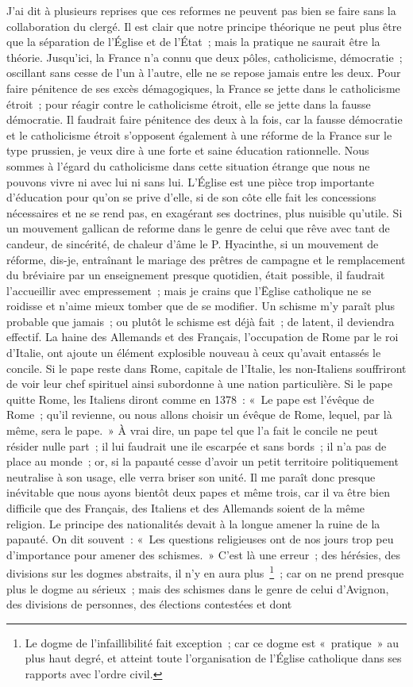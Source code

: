 \documentclass[french,twoside]{book} %
\begin{document}
J’ai dit à plusieurs reprises que ces reformes ne peuvent pas bien se faire sans la collaboration du clergé. Il est clair que notre principe théorique ne peut plus être que la séparation de l’Église et de l’État ; mais la pratique ne saurait être la théorie. Jusqu’ici, la France n’a connu que deux pôles, catholicisme, démocratie ; oscillant sans cesse de l’un à l’autre, elle ne se repose jamais entre les deux. Pour faire pénitence de ses excès démagogiques, la France se jette dans le catholicisme étroit ; pour réagir contre le catholicisme étroit, elle se jette dans la fausse démocratie. Il faudrait faire pénitence des deux à la fois, car la fausse démocratie et le catholicisme étroit s’opposent également à une réforme de la France sur le type prussien, je veux dire à une forte et saine éducation rationnelle. Nous sommes à l’égard du catholicisme dans cette situation étrange que nous ne pouvons vivre ni avec lui ni sans lui. L’Église est une pièce trop importante d’éducation pour qu’on se prive d’elle, si de son côte elle fait les concessions nécessaires et ne se rend pas, en exagérant ses doctrines, plus nuisible qu’utile. Si un mouvement gallican de reforme dans le genre de celui que rêve avec tant de candeur, de sincérité, de chaleur d’âme le P. Hyacinthe, si un mouvement de réforme, dis-je, entraînant le mariage des prêtres de campagne et le remplacement du bréviaire par un enseignement presque quotidien, était possible, il faudrait l’accueillir avec empressement ; mais je crains que l’Ëglise catholique ne se roidisse et n’aime mieux tomber que de se modifier. Un schisme m’y paraît plus probable que jamais ; ou plutôt le schisme est déjà fait ; de latent, il deviendra effectif. La haine des Allemands et des Français, l’occupation de Rome par le roi d’Italie, ont ajoute un élément explosible nouveau à ceux qu’avait entassés le concile. Si le pape reste dans Rome, capitale de l’Italie, les non-Italiens souffriront de voir leur chef spirituel ainsi subordonne à une nation particulière. Si le pape quitte Rome, les Italiens diront comme en 1378 : « Le pape est l’évêque de Rome ; qu’il revienne, ou nous allons choisir un évêque de Rome, lequel, par là même, sera le pape. » À vrai dire, un pape tel que l’a fait le concile ne peut résider nulle part ; il lui faudrait une ile escarpée et sans bords ; il n’a pas de place au monde ; or, si la papauté cesse d’avoir un petit territoire politiquement neutralise à son usage, elle verra briser son unité. Il me paraît donc presque inévitable que nous ayons bientôt deux papes et même trois, car il va être bien difficile que des Français, des Italiens et des Allemands soient de la même religion. Le principe des nationalités devait à la longue amener la ruine de la papauté. On dit souvent : « Les questions religieuses ont de nos jours trop peu d’importance pour amener des schismes. » C’est là une erreur ; des hérésies, des divisions sur les dogmes abstraits, il n’y en aura plus \footnote{Le dogme de l’infaillibilité fait exception ; car ce dogme est « pratique » au plus haut degré, et atteint toute l’organisation de l’Église catholique dans ses rapports avec l’ordre civil.} ; car on ne prend presque plus le dogme au sérieux ; mais des schismes dans le genre de celui d’Avignon, des divisions de personnes, des élections contestées et dont 
\end{document}
